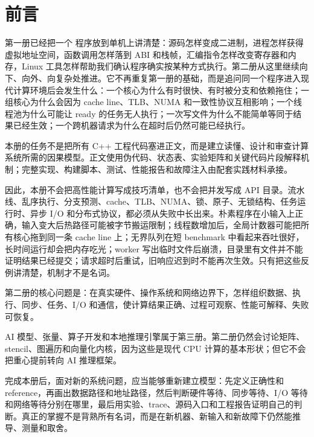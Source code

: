 \chapter*{前言}

第一册已经把一个 \cpp 程序放到单机上讲清楚：源码怎样变成二进制，进程怎样获得虚拟地址空间，函数调用怎样落到 ABI 和栈帧，汇编指令怎样改变寄存器和内存，Linux 工具怎样帮助我们确认程序确实按某种方式执行。第二册从这里继续向下、向外、向复杂处推进。它不再重复第一册的基础，而是追问同一个程序进入现代计算环境后会发生什么：一个核心为什么有时很快、有时被分支和依赖拖住；一组核心为什么会因为 cache line、TLB、NUMA 和一致性协议互相影响；一个线程池为什么可能让 ready 的任务无人执行；一次写文件为什么不能简单等同于结果已经生效；一个跨机器请求为什么在超时后仍然可能已经执行。

本册的任务不是把所有 C++ 工程代码塞进正文，而是建立读懂、设计和审查计算系统所需的因果模型。正文使用伪代码、状态表、实验矩阵和关键代码片段解释机制；完整实现、构建脚本、测试、性能报告和故障注入由配套实践材料承接。

因此，本册不会把高性能计算写成技巧清单，也不会把并发写成 API 目录。流水线、乱序执行、分支预测、cache、TLB、NUMA、锁、原子、无锁结构、任务运行时、异步 I/O 和分布式协议，都必须从失败中长出来。朴素程序在小输入上正确，输入变大后热路径可能被字节搬运限制；线程数增加后，全局计数器可能把所有核心拖到同一条 cache line 上；无界队列在短 benchmark 中看起来吞吐很好，长时间运行却会把内存吃光；worker 写出临时文件后崩溃，目录里有文件并不能证明结果已经提交；请求超时后重试，旧响应迟到时不能再次生效。只有把这些反例讲清楚，机制才不是名词。

\begin{keyidea}
第二册的核心问题是：在真实硬件、操作系统和网络边界下，怎样组织数据、执行、同步、任务、I/O 和通信，使计算结果正确、过程可观察、性能可解释、失败可恢复。
\end{keyidea}

AI 模型、张量、算子开发和本地推理引擎属于第三册。第二册仍然会讨论矩阵、stencil、图遍历和向量化内核，因为这些是现代 CPU 计算的基本形状；但它不会把重心提前转向 AI 推理框架。

完成本册后，面对新的系统问题，应当能够重新建立模型：先定义正确性和 reference，再画出数据路径和地址路径，然后判断硬件等待、同步等待、I/O 等待和网络等待分别在哪里，最后用实验、trace、源码入口和工程报告证明自己的判断。真正的掌握不是背熟所有名词，而是在新机器、新输入和新故障下仍然能推导、测量和取舍。
